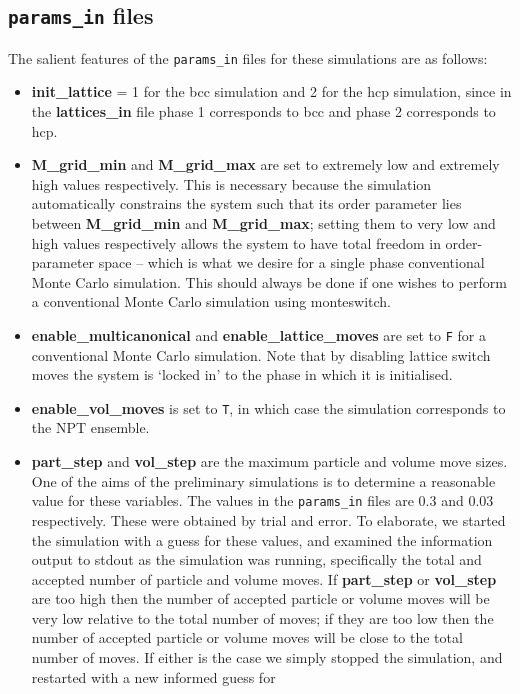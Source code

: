 \documentclass{report}
\begin{document}
\subsection{\texttt{params\_in} files}
The salient features of the \texttt{params\_in} files for these simulations are as follows:
\begin{itemize}
\item \textbf{init\_lattice} = 1 for the bcc simulation and 2 for the hcp simulation, since in the \textbf{lattices\_in} file phase 1 corresponds to
  bcc and phase 2 corresponds to hcp.
\item \textbf{M\_grid\_min} and \textbf{M\_grid\_max} are set to extremely low and extremely high values respectively. This is necessary because
  the simulation automatically constrains the system such that its order parameter lies between \textbf{M\_grid\_min} and \textbf{M\_grid\_max};
  setting them to very low and high values respectively allows the system to have total freedom in order-parameter space --
  which is what we desire for a single phase conventional Monte Carlo simulation. This should always be done if one wishes
  to perform a conventional Monte Carlo simulation using monteswitch.
\item \textbf{enable\_multicanonical} and \textbf{enable\_lattice\_moves} are set to \texttt{F} for a conventional Monte Carlo simulation. Note that by
  disabling lattice switch moves the system is `locked in' to the phase in which it is initialised.
\item \textbf{enable\_vol\_moves} is set to \texttt{T}, in which case the simulation corresponds to the NPT ensemble. 
\item \textbf{part\_step} and \textbf{vol\_step} are the maximum particle and volume move sizes. One of the aims of the preliminary simulations is
  to determine a reasonable value for these variables. The values in the \texttt{params\_in} files are 0.3 and 0.03 respectively. These
  were obtained by trial and error. To elaborate, we started the simulation with a guess for these values, and examined the 
  information output to stdout as the simulation was running, specifically the total and accepted number of particle and 
  volume moves. If \textbf{part\_step} or \textbf{vol\_step} are too high then the number of accepted particle or volume moves will be very low 
  relative to the total number of moves; if they are too low then the number of accepted particle or volume moves will be close
  to the total number of moves. If either is the case we simply stopped the simulation, and restarted with a new informed guess for

\end{itemize}
\end{document}
